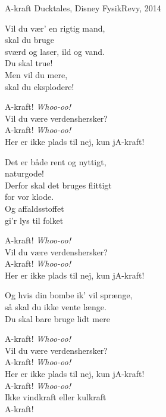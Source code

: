 \begin{song}{A-kraft}
  {} %
  {Ducktales, Disney} %
  {} %
  {FysikRevy, 2014} %
  {\NotCCLIed} %

  \begin{SBVerse}
    Vil du vær' en rigtig mand,\\
    skal du bruge\\
    sværd og laser, ild og vand.\\
    Du skal true!\\
    Men vil du mere,\\
    skal du eksplodere!
  \end{SBVerse}

  \begin{SBChorus}
    A-kraft! \emph{Whoo-oo!}\\
    Vil du være verdenshersker?\\
    A-kraft! \emph{Whoo-oo!}\\
    Her er ikke plads til nej, kun jA-kraft!
  \end{SBChorus}

  \begin{SBVerse}
    Det er både rent og nyttigt,\\
    naturgode!\\
    Derfor skal det bruges flittigt\\
    for vor klode.\\
    Og affaldsstoffet\\
    gi'r lys til folket
  \end{SBVerse}

  \begin{SBChorus}
    A-kraft! \emph{Whoo-oo!}\\
    Vil du være verdenshersker?\\
    A-kraft! \emph{Whoo-oo!}\\
    Her er ikke plads til nej, kun jA-kraft!
  \end{SBChorus}

  \begin{SBSection*}
    Og hvis din bombe ik' vil sprænge,\\
    så skal du ikke vente længe.\\
    Du skal bare bruge lidt mere
  \end{SBSection*}

  \begin{SBChorus}
    A-kraft! \emph{Whoo-oo!}\\
    Vil du være verdenshersker?\\
    A-kraft! \emph{Whoo-oo!}\\
    Her er ikke plads til nej, kun jA-kraft!\\
    A-kraft! \emph{Whoo-oo!}\\
    Ikke vindkraft eller kulkraft\\
    A-kraft!
  \end{SBChorus}
\end{song}
